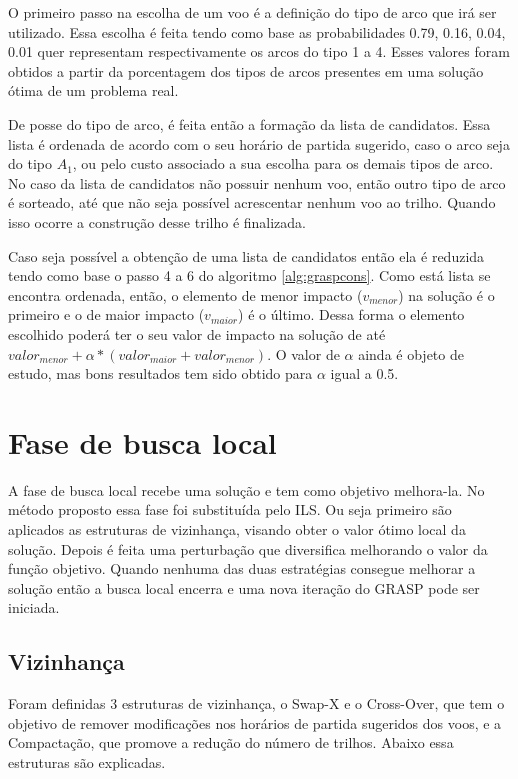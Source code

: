 O primeiro passo na escolha de um voo é a definição do tipo de arco que irá ser
utilizado. Essa escolha é feita tendo como base as probabilidades 0.79, 0.16,
0.04, 0.01 quer representam respectivamente os arcos do tipo 1 a 4. Esses
valores foram obtidos a partir da porcentagem dos tipos de arcos presentes em
uma solução ótima de um problema real.
 
De posse do tipo de arco, é feita então a formação da lista de candidatos. Essa
lista é ordenada de acordo com o seu horário de partida sugerido, caso o arco
seja do tipo $A_{1}$, ou pelo custo associado a sua escolha para os demais
tipos de arco. No caso da lista de candidatos não possuir nenhum voo, então
outro tipo de arco é sorteado, até que não seja possível acrescentar nenhum voo
ao trilho. Quando isso ocorre a construção desse trilho é finalizada.
 
Caso seja possível a obtenção de uma lista de candidatos então ela é reduzida
tendo como base o passo 4 a 6 do algoritmo \ref{alg:graspcons}. Como está lista
se encontra ordenada, então, o elemento de menor impacto ($v_{menor}$) na
solução é o primeiro e o de maior impacto ($v_{maior}$) é o último. Dessa forma
o elemento escolhido poderá ter o seu valor de impacto na solução de até
$valor_{menor} + \alpha*(valor_{maior} + valor_{menor})$. O valor de $\alpha$
ainda é objeto de estudo, mas bons resultados tem sido obtido para $\alpha$
igual a 0.5.
 
 \section{Fase de busca local}
 
A fase de busca local recebe uma solução e tem como objetivo melhora-la. No
método proposto essa fase foi substituída pelo ILS. Ou seja primeiro são
aplicados as estruturas de vizinhança, visando obter o valor ótimo local da
solução. Depois é feita uma perturbação que diversifica melhorando o valor da
função objetivo. Quando nenhuma das duas estratégias consegue melhorar a
solução então a busca local encerra e uma nova iteração do GRASP pode ser
iniciada.
 
 \subsection{Vizinhança}
 
Foram definidas 3 estruturas de vizinhança, o Swap-X e o Cross-Over, que tem o
objetivo de remover modificações nos horários de partida sugeridos dos voos, e
a Compactação, que promove a redução do número de trilhos. Abaixo essa
estruturas são explicadas.
 
